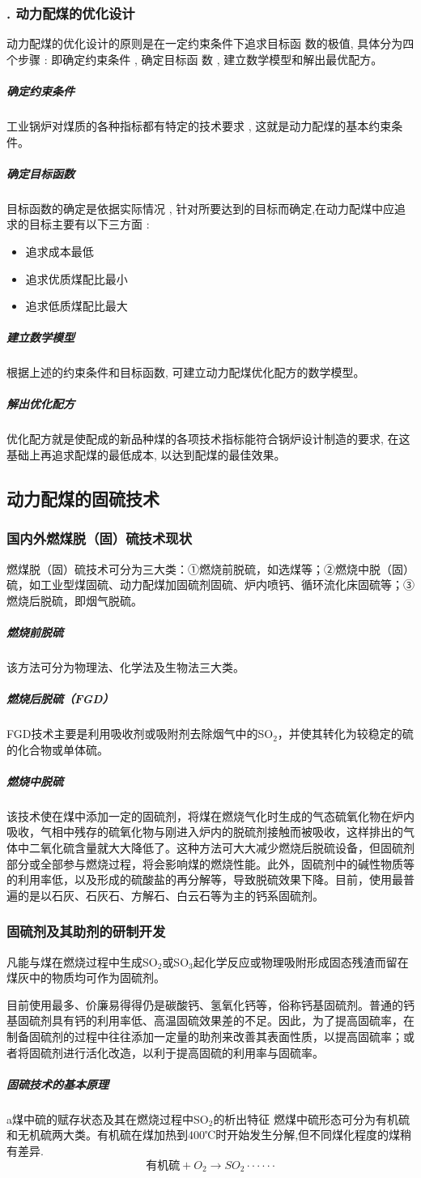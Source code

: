 \documentclass[10pt,openany]{ctexbook}
\begin{document}
\subsubsection{. 动力配煤的优化设计}
动力配煤的优化设计的原则是在一定约束条件下追求目标函 数的极值, 具体分为四个步骤 : 即确定约束条件 , 确定目标函 数 , 建立数学模型和解出最优配方。
\subparagraph{确定约束条件} 工业锅炉对煤质的各种指标都有特定的技术要求 , 这就是动力配煤的基本约束条件。
\subparagraph{确定目标函数} 目标函数的确定是依据实际情况 , 针对所要达到的目标而确定,在动力配煤中应追求的目标主要有以下三方面 :
\begin{itemize}
\item 追求成本最低
\item 追求优质煤配比最小
\item 追求低质煤配比最大
\end{itemize}
\subparagraph{建立数学模型}
根据上述的约束条件和目标函数, 可建立动力配煤优化配方的数学模型。
\subparagraph{解出优化配方} 优化配方就是使配成的新品种煤的各项技术指标能符合锅炉设计制造的要求, 在这基础上再追求配煤的最低成本, 以达到配煤的最佳效果。
\subsection{动力配煤的固硫技术}
\subsubsection{国内外燃煤脱（固）硫技术现状} 燃煤脱（固）硫技术可分为三大类：①燃烧前脱硫，如选煤等；②燃烧中脱（固）硫，如工业型煤固硫、动力配煤加固硫剂固硫、炉内喷钙、循环流化床固硫等；③燃烧后脱硫，即烟气脱硫。
\subparagraph{燃烧前脱硫}  该方法可分为物理法、化学法及生物法三大类。
\subparagraph{燃烧后脱硫（FGD）}
   FGD技术主要是利用吸收剂或吸附剂去除烟气中的SO$_2$，并使其转化为较稳定的硫的化合物或单体硫。
 \subparagraph{燃烧中脱硫}
该技术使在煤中添加一定的固硫剂，将煤在燃烧气化时生成的气态硫氧化物在炉内吸收，气相中残存的硫氧化物与刚进入炉内的脱硫剂接触而被吸收，这样排出的气体中二氧化硫含量就大大降低了。这种方法可大大减少燃烧后脱硫设备，但固硫剂部分或全部参与燃烧过程，将会影响煤的燃烧性能。此外，固硫剂中的碱性物质等的利用率低，以及形成的硫酸盐的再分解等，导致脱硫效果下降。目前，使用最普遍的是以石灰、石灰石、方解石、白云石等为主的钙系固硫剂。
\subsubsection{固硫剂及其助剂的研制开发}
凡能与煤在燃烧过程中生成SO$_2$或SO$_3$起化学反应或物理吸附形成固态残渣而留在煤灰中的物质均可作为固硫剂。\par
    目前使用最多、价廉易得得仍是碳酸钙、氢氧化钙等，俗称钙基固硫剂。普通的钙基固硫剂具有钙的利用率低、高温固硫效果差的不足。因此，为了提高固硫率，在制备固硫剂的过程中往往添加一定量的助剂来改善其表面性质，以提高固硫率；或者将固硫剂进行活化改造，以利于提高固硫的利用率与固硫率。
 \subparagraph{固硫技术的基本原理}
  a煤中硫的赋存状态及其在燃烧过程中SO$_2$的析出特征
燃煤中硫形态可分为有机硫和无机硫两大类。有机硫在煤加热到400℃时开始发生分解,但不同煤化程度的煤稍有差异.
$$\mbox{有机硫}+O_2\longrightarrow SO_2 ······$$
\end{document}
